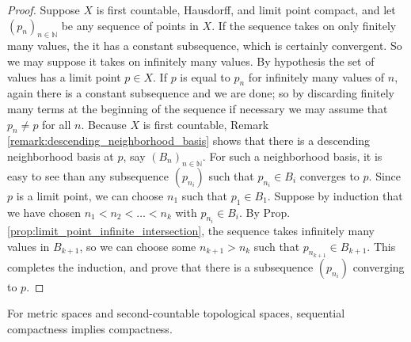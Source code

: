 \documentclass[11pt,a4paper]{article}
\begin{document}
\begin{proof}
Suppose $X$ is first countable, Hausdorff, and limit point compact, and let $(p_n)_{n\in \mathbb{N}}$ be any sequence of points in $X$. If the sequence takes on only finitely many values, the it has a constant subsequence, which is certainly convergent. So we may suppose it takes on infinitely many values. By hypothesis the set of values has a limit point $p\in X$. If $p$ is equal to $p_n$ for infinitely many values of $n$, again there is a constant subsequence and we are done; so by discarding finitely many terms at the beginning of the sequence if necessary we may assume that $p_n\neq p$ for all $n$. Because $X$ is first countable, Remark \ref{remark:descending_neighborhood_basis} shows that there is a descending neighborhood basis at $p$, say $(B_n)_{n\in \mathbb{N}}$. For such a neighborhood basis, it is easy to see than any subsequence $(p_{n_i})$ such that $p_{n_i}\in B_i$ converges to $p$. Since $p$ is a limit point, we can choose $n_1$ such that $p_1\in B_1$. Suppose by induction that we have chosen $n_1<n_2<\ldots<n_k$ with $p_{n_i}\in B_i$. By Prop. \ref{prop:limit_point_infinite_intersection}, the sequence takes infinitely many values in $B_{k+1}$, so we can choose some $n_{k+1}>n_k$ such that $p_{n_{k+1}}\in B_{k+1}$. This completes the induction, and prove that there is a subsequence $(p_{n_i})$ converging to $p$.
\end{proof}

\begin{proposition}
For metric spaces and second-countable topological spaces, sequential compactness implies compactness.
\end{proposition}
\end{document}
